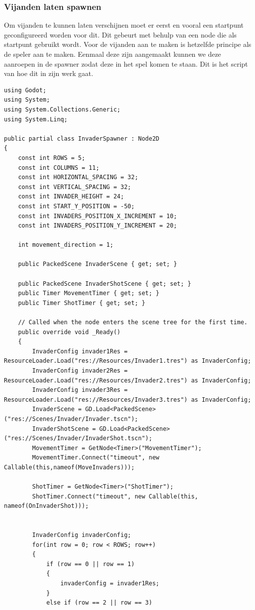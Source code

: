 \subsubsection{Vijanden laten spawnen}
Om vijanden te kunnen laten verschijnen moet er eerst en vooral een startpunt geconfigureerd worden voor dit. Dit gebeurt met behulp van een node die als startpunt gebruikt wordt. 
Voor de vijanden aan te maken is hetzelfde principe als de speler aan te maken. Eenmaal deze zijn aangemaakt kunnen we deze aanroepen in de spawner zodat deze in het spel komen te staan. Dit is het script van hoe dit in zijn werk gaat.
\begin{lstlisting}[style=csharp]
using Godot;
using System;
using System.Collections.Generic;
using System.Linq;

public partial class InvaderSpawner : Node2D
{
    const int ROWS = 5;
    const int COLUMNS = 11;
    const int HORIZONTAL_SPACING = 32;
    const int VERTICAL_SPACING = 32;
    const int INVADER_HEIGHT = 24;
    const int START_Y_POSITION = -50;
    const int INVADERS_POSITION_X_INCREMENT = 10;
    const int INVADERS_POSITION_Y_INCREMENT = 20;
    
    int movement_direction = 1;
    
    public PackedScene InvaderScene { get; set; }
    
    public PackedScene InvaderShotScene { get; set; }
    public Timer MovementTimer { get; set; }
    public Timer ShotTimer { get; set; }
    
    // Called when the node enters the scene tree for the first time.
    public override void _Ready()
    {
        InvaderConfig invader1Res = ResourceLoader.Load("res://Resources/Invader1.tres") as InvaderConfig;
        InvaderConfig invader2Res = ResourceLoader.Load("res://Resources/Invader2.tres") as InvaderConfig;
        InvaderConfig invader3Res = ResourceLoader.Load("res://Resources/Invader3.tres") as InvaderConfig;
        InvaderScene = GD.Load<PackedScene>("res://Scenes/Invader/Invader.tscn");
        InvaderShotScene = GD.Load<PackedScene>("res://Scenes/Invader/InvaderShot.tscn");
        MovementTimer = GetNode<Timer>("MovementTimer");
        MovementTimer.Connect("timeout", new Callable(this,nameof(MoveInvaders)));
        
        ShotTimer = GetNode<Timer>("ShotTimer");
        ShotTimer.Connect("timeout", new Callable(this, nameof(OnInvaderShot)));
        
        
        InvaderConfig invaderConfig;
        for(int row = 0; row < ROWS; row++)
        {
            if (row == 0 || row == 1)
            {
                invaderConfig = invader1Res;
            }
            else if (row == 2 || row == 3)
            

\end{lstlisting}
